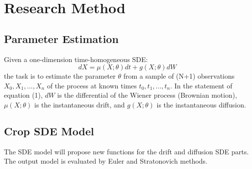 \section*{Research Method}
\subsection*{Parameter Estimation}
Given a one-dimension time-homogeneous SDE:
\begin{equation}
    dX = \mu(X;\theta)dt + g(X;\theta)dW
\end{equation}
the task is to estimate the parameter $\theta$ from a sample of (N+1) observations $X_0, X_1, ..., X_n$ of the process at 
known times $t_0, t_1, ..., t_n$. In the statement of equation (1), $dW$ is the differential of the Wiener process 
(Brownian motion), $\mu(X;\theta)$ is the instantaneous drift, and $g(X;\theta)$ is the instantaneous diffusion.

\subsection*{Crop SDE Model}
The SDE model will propose new functions for the drift and diffusion SDE parts. The output model is evaluated by Euler and 
Stratonovich methods.
